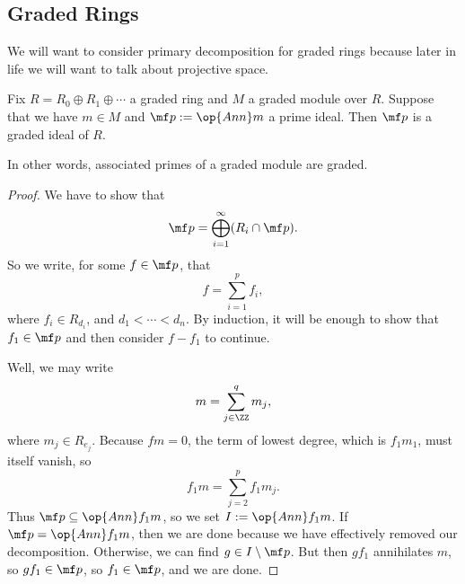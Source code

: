 \subsection{Graded Rings}
We will want to consider primary decomposition for graded rings because later in life we will want to talk about projective space.
\begin{proposition}
	Fix $R=R_0\oplus R_1\oplus\cdots$ a graded ring and $M$ a graded module over $R$. Suppose that we have $m\in M$ and $\mf p:=\op{Ann}m$ a prime ideal. Then $\mf p$ is a graded ideal of $R$.
\end{proposition}
In other words, associated primes of a graded module are graded.
\begin{proof}
	We have to show that
	\[\mf p=\bigoplus_{i=1}^\infty(R_i\cap\mf p).\]
	So we write, for some $f\in\mf p$, that
	\[f=\sum_{i=1}^p f_i,\]
	where $f_i\in R_{d_i}$, and $d_1<\cdots<d_n$. By induction, it will be enough to show that $f_1\in\mf p$ and then consider $f-f_1$ to continue. 
	
	Well, we may write
	\[m=\sum_{j\in\ZZ}^qm_j,\]
	where $m_j\in R_{e_j}$. Because $fm=0$, the term of lowest degree, which is $f_1m_1$, must itself vanish, so
	\[f_1m=\sum_{j=2}^pf_1m_j.\]
	Thus $\mf p\subseteq\op{Ann}f_1m$, so we set $I:=\op{Ann}f_1m$. If $\mf p=\op{Ann}f_1m$, then we are done because we have effectively removed our decomposition. Otherwise, we can find $g\in I\setminus\mf p$. But then $gf_1$ annihilates $m$, so $gf_1\in\mf p$, so $f_1\in\mf p$, and we are done.
\end{proof}